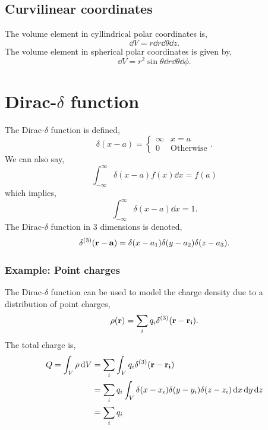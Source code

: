 \documentclass{book}
\begin{document}
\subsection{Curvilinear coordinates}
The volume element in cyllindrical polar coordinates is,
\begin{equation}
	\dd{V} = r\dd{r}\dd{\theta}\dd{z}.
\end{equation}
The volume element in spherical polar coordinates is given by,
\begin{equation}
	\dd{V} = r^2\sin\theta\dd{r}\dd{\theta}\dd{\phi}.
\end{equation}
\section{Dirac-$\delta$ function}
The Dirac-$\delta$ function is defined,
\begin{equation}
	\delta(x - a) = \begin{cases}
		\infty & x = a\\
		0 & \text{Otherwise}
	\end{cases}.
\end{equation}
We can also say,
\begin{equation}
	\int_{-\infty}^{\infty}\delta(x-a)f(x)\dd{x} = f(a)
\end{equation}
which implies,
\begin{equation}
	\int_{-\infty}^{\infty}\delta(x-a)\dd{x} = 1.
\end{equation}
The Dirac-$\delta$ function in 3 dimensions is denoted,
\begin{equation}
	\delta^{(3)}(\vb{r}-\vb{a}) = \delta(x - a_1)\delta(y - a_2)\delta(z - a_3).
\end{equation}
\subsubsection{Example: Point charges}
The Dirac-$\delta$ function can be used to model the charge density due to a distribution of point charges,
\begin{equation}
	\rho(\vb{r}) = \sum_i q_i\delta^{(3)}(\vb{r}-\vb{r_i}).
\end{equation}
The total charge is,
\begin{equation}
	\begin{split}
	Q = \int_V \rho \dd{V} &= \sum_i \int_V q_i\delta^{(3)}(\vb{r}-\vb{r_i}) \\
	& = \sum_i q_i\int_V \delta(x - x_i)\delta(y - y_i)\delta(z - z_i)\dd{x}\dd{y}\dd{z} \\
	& = \sum_i q_i
	\end{split}
\end{equation}
\end{document}
